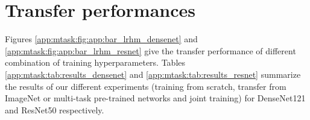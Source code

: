 
\section{Transfer performances}
\label{app:mtask:sec:app:transfer_perf}

Figures \ref{app:mtask:fig:app:bar_lrhm_densenet} and \ref{app:mtask:fig:app:bar_lrhm_resnet} give the transfer performance of different combination of training hyperparameters. Tables \ref{app:mtask:tab:results_densenet} and \ref{app:mtask:tab:results_resnet} summarize the results of our different experiments (training from scratch, transfer from ImageNet or multi-task pre-trained networks and joint training) for DenseNet121 and ResNet50 respectively.

